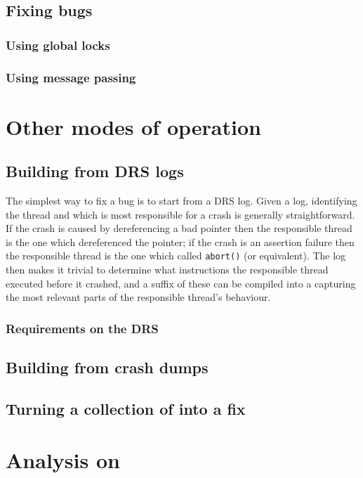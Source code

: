 \documentclass[12pt,a4paper]{book}
\begin{document}
\section{Fixing bugs}

\subsection{Using global locks}
\subsection{Using message passing}

\chapter{Other modes of operation}
\section{Building \StateMachines from DRS logs}
The simplest way to fix a bug is to start from a DRS log.
Given a log, identifying the thread and which is most responsible for a crash is generally straightforward.
If the crash is caused by dereferencing a bad pointer then the responsible thread is the one which dereferenced the pointer; if the crash is an assertion failure then the responsible thread is the one which called \verb|abort()| (or equivalent).
The log then makes it trivial to determine what instructions the responsible thread executed before it crashed, and a suffix of these can be compiled into a \StateMachine capturing the most relevant parts of the responsible thread's behaviour.


\subsection{Requirements on the DRS}
\section{Building \StateMachines from crash dumps}
\section{Turning a collection of \StateMachines into a fix}

\chapter{Analysis on \StateMachines}
\end{document}
